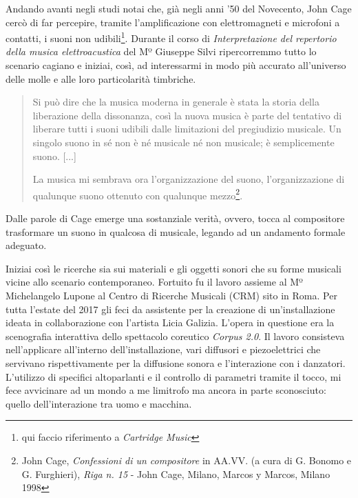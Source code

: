 Andando avanti negli studi notai che, già negli anni '50 del Novecento, John Cage cercò di far percepire, tramite l'amplificazione con elettromagneti e microfoni a contatti, i suoni non udibili\footnote{qui faccio riferimento a \textit{Cartridge Music}}. Durante il corso di \textit{Interpretazione del repertorio della musica elettroacustica} del Mº Giuseppe Silvi ripercorremmo tutto lo scenario cagiano e iniziai, così, ad interessarmi in modo più accurato all'universo delle molle e alle loro particolarità timbriche.

\begin{small}
\begin{quotation}
Si può dire che la musica moderna in generale è stata la storia della liberazione della dissonanza, così la nuova musica è parte del tentativo di liberare tutti i suoni udibili dalle limitazioni del pregiudizio musicale.
Un singolo suono in sé non è né musicale né non musicale; è semplicemente suono. [...]

La musica mi sembrava ora l'organizzazione del suono, l'organizzazione di qualunque suono ottenuto con qualunque mezzo\footnote{John Cage, \textit{Confessioni di un compositore} in AA.VV. (a cura di G. Bonomo e G. Furghieri), \textit{Riga n. 15} - John Cage, Milano, Marcos y Marcos, Milano 1998}.
\end{quotation}
\end{small}

Dalle parole di Cage emerge una sostanziale verità, ovvero, tocca al compositore trasformare un suono in qualcosa di musicale, legando ad un andamento formale adeguato. 

Iniziai così le ricerche sia sui materiali e gli oggetti sonori che su forme musicali vicine allo scenario contemporaneo. Fortuito fu il lavoro assieme al Mº Michelangelo Lupone al Centro di Ricerche Musicali (CRM) sito in Roma. Per tutta l'estate del 2017 gli feci da assistente per la creazione di un'installazione ideata in collaborazione con l'artista Licia Galizia. L'opera in questione era la scenografia interattiva dello spettacolo coreutico \textit{Corpus 2.0}. Il lavoro consisteva nell'applicare all'interno dell'installazione, vari diffusori e piezoelettrici che servivano rispettivamente per la diffusione sonora e l'interazione con i danzatori. L'utilizzo di specifici altoparlanti e il controllo di parametri tramite il tocco, mi fece avvicinare ad un mondo a me limitrofo ma ancora in parte sconosciuto: quello dell'interazione tra uomo e macchina.


